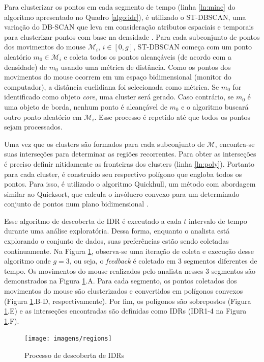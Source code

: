 Para clusterizar os pontos em cada segmento de tempo (linha \ref{ln:mine} do algoritmo apresentado no Quadro \ref{algo:idr}), é utilizado o ST-DBSCAN, uma variação do DB-SCAN que leva em consideração atributos espaciais e temporais para clusterizar pontos com base na densidade \cite{Birant:2007}. Para cada subconjunto de pontos dos movimentos do mouse $\mathcal{M}_i$, $i \in [0,g]$, ST-DBSCAN começa com um ponto aleatório $m_0 \in \mathcal{M}_i$ e coleta todos os pontos alcançáveis (de acordo com a densidade) de $m_0$ usando uma métrica de distância. Como os pontos dos movimentos do mouse ocorrem em um espaço bidimensional (monitor do computador), a distância euclidiana foi selecionada como métrica. Se $m_0$ for identificado como objeto {\em core}, uma cluster será gerado. Caso contrário, se $m_0$ é uma objeto de borda, nenhum ponto é alcançável de $m_0$ e o algoritmo buscará outro ponto aleatório em $\mathcal{M}_i$. Esse processo é repetido até que todos os pontos sejam processados.

Uma vez que os clusters são formados para cada subconjunto de $\mathcal{M}$, encontra-se suas interseções para determinar as regiões recorrentes. Para obter as interseções é preciso definir nitidamente as fronteiras dos clusters (linha \ref{ln:poly}). Portanto para cada cluster, é construído seu respectivo polígono que engloba todos os pontos. Para isso, é utilizado o algoritmo Quickhull, um método com abordagem similar ao Quicksort, que calcula o invólucro convexo para um determinado conjunto de pontos num plano bidimensional \cite{Barber:1996}.

Esse algoritmo de descoberta de IDR é executado a cada $t$ intervalo de tempo durante uma análise exploratória. Dessa forma, enquanto o analista está explorando o conjunto de dados, suas preferências estão sendo coletadas continuamente. Na Figura \ref{fig:descoberta-idr}, observa-se uma iteração de coleta e execução desse algoritmo onde $g = 3$, ou seja, o {\em feedback} é coletado em 3 segmentos diferentes de tempo. Os movimentos do mouse realizados pelo analista nesses 3 segmentos são demonstrados na Figura \ref{fig:descoberta-idr}.A. Para cada segmento, os pontos coletados dos movimentos do mouse são clusterizados e convertidos em polígonos convexos (Figura \ref{fig:descoberta-idr}.B-D, respectivamente). Por fim, os polígonos são sobrepostos (Figura \ref{fig:descoberta-idr}.E) e as interseções encontradas são definidas como IDRs (IDR1-4 na Figura \ref{fig:descoberta-idr}.F).

\begin{figure}[t]
	\caption{Processo de descoberta de IDRs}
	\label{fig:descoberta-idr}
	\centering
	\texttt{[image: imagens/regions]}
	\mfonte
\end{figure}

